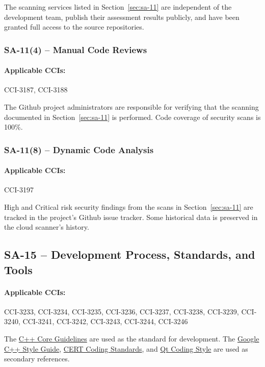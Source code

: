 \documentclass[letterpaper, 10pt, twoside]{article}
\begin{document}
The scanning services listed in Section~\ref{sec:sa-11} are independent of the development team, publish their assessment results publicly, and have been granted full access to the source repositories.

\subsubsection{SA-11(4) -- Manual Code Reviews}

\paragraph{Applicable CCIs:} CCI-3187, CCI-3188

The Github project administrators are responsible for verifying that the scanning documented in Section~\ref{sec:sa-11} is performed. Code coverage of security scans is 100\%.

\subsubsection{SA-11(8) -- Dynamic Code Analysis}

\paragraph{Applicable CCIs:} CCI-3197

High and Critical risk security findings from the scans in Section~\ref{sec:sa-11} are tracked in the project's Github issue tracker. Some historical data is preserved in the cloud scanner's history.

\subsection{SA-15 -- Development Process, Standards, and Tools}

\paragraph{Applicable CCIs:} CCI-3233, CCI-3234, CCI-3235, CCI-3236, CCI-3237, CCI-3238, CCI-3239, CCI-3240, CCI-3241, CCI-3242, CCI-3243, CCI-3244, CCI-3246

The \href{http://isocpp.github.io/CppCoreGuidelines/CppCoreGuidelines#S-functions}{C++ Core Guidelines} are used as the standard for development. The \href{https://google.github.io/styleguide/cppguide.html}{Google C++ Style Guide}, \href{https://resources.sei.cmu.edu/downloads/secure-coding/assets/sei-cert-cpp-coding-standard-2016-v01.pdf}{CERT Coding Standards}, and \href{https://wiki.qt.io/Qt_Coding_Style}{Qt Coding Style} are used as secondary references.
\end{document}
